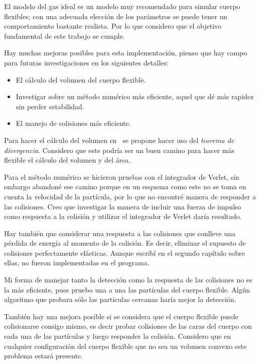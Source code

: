 El modelo del gas ideal es un modelo muy recomendado para simular cuerpo flexibles; con una adecuada elección de los parámetros se puede tener un comportamiento bastante realista.
Por lo que considero que el objetivo fundamental de este trabajo se cumple.

Hay muchas mejoras posibles para esta implementación, pienso que hay campo para futuras investigaciones en los siguientes detalles:

\begin{itemize}
 \item El cálculo del volumen del cuerpo flexible.
 \item Investigar sobre un método numérico más eficiente, aquel que dé más rapidez sin perder estabilidad.
 \item El manejo de colisiones más eficiente.
\end{itemize}

Para hacer el cálculo del volumen en~\cite{Matika:SoftBody} se propone hacer uso del \emph{teorema de divergencia}.
Considero que este podría ser un buen camino para hacer más flexible el cálculo del volumen y del área.

Para el método numérico se hicieron pruebas con el integrador de Verlet, sin embargo abandoné ese camino porque en un esquema como este no se toma en cuenta la velocidad de la partícula, por lo que no encontré manera de responder a las colisiones.
Creo que investigar la manera de incluir una fuerza de impulso como respuesta a la colisión y utilizar el integrador de Verlet daría resultado.

Hay también que considerar una respuesta a las colisiones que conlleve una pérdida de energía al momento de la colisión.
Es decir, eliminar el supuesto de colisiones perfectamente elásticas.
Aunque escribí en el segundo capítulo sobre ellas, no fueron implementadas en el programa.

Mi forma de manejar tanto la detección como la respuesta de las colisiones  no es la más eficiente, pues pruebo una a una las partículas del cuerpo flexible.
Algún algoritmo que probara sólo las partículas cercanas haría mejor la detección.

También hay una mejora posible si se considera que el cuerpo flexible puede colisionarse consigo mismo, es decir probar colisiones de las caras del cuerpo con cada una de las partículas y luego responder la colisión.
Considero que en cualquier configuración del cuerpo flexible que no sea un volumen convexo este problema estará presente.
